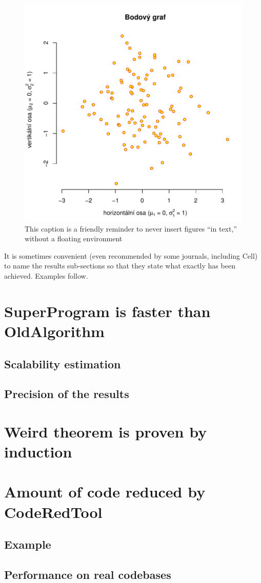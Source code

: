 \begin{figure}
\centering
\includegraphics[width=.6\linewidth]{img/ukazka-obr01.pdf}
\caption{This caption is a friendly reminder to never insert figures ``in text,'' without a floating environment}
\label{fig:f}
\end{figure}

It is sometimes convenient (even recommended by some journals, including Cell) to name the results sub-sections so that they state what exactly has been achieved. Examples follow.

\section{SuperProgram is faster than OldAlgorithm}
\subsection{Scalability estimation}
\subsection{Precision of the results}
\section{Weird theorem is proven by induction}
\section{Amount of code reduced by CodeRedTool}
\subsection{Example}
\subsection{Performance on real codebases}
